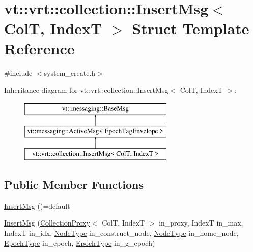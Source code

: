 \hypertarget{structvt_1_1vrt_1_1collection_1_1_insert_msg}{}\section{vt\+:\+:vrt\+:\+:collection\+:\+:Insert\+Msg$<$ ColT, IndexT $>$ Struct Template Reference}
\label{structvt_1_1vrt_1_1collection_1_1_insert_msg}


{\ttfamily \#include $<$system\+\_\+create.\+h$>$}

Inheritance diagram for vt\+:\+:vrt\+:\+:collection\+:\+:Insert\+Msg$<$ ColT, IndexT $>$\+:\begin{figure}[H]
\begin{center}
\leavevmode
\includegraphics[height=3.000000cm]{structvt_1_1vrt_1_1collection_1_1_insert_msg}
\end{center}
\end{figure}
\subsection*{Public Member Functions}
\begin{DoxyCompactItemize}
\item 
\hyperlink{structvt_1_1vrt_1_1collection_1_1_insert_msg_a44aed2e193e9972e28eb9c757cfe4e0b}{Insert\+Msg} ()=default
\item 
\hyperlink{structvt_1_1vrt_1_1collection_1_1_insert_msg_a56b81ce822e935c00a7419734844d288}{Insert\+Msg} (\hyperlink{structvt_1_1vrt_1_1collection_1_1_collection_proxy}{Collection\+Proxy}$<$ ColT, IndexT $>$ in\+\_\+proxy, IndexT in\+\_\+max, IndexT in\+\_\+idx, \hyperlink{namespacevt_a866da9d0efc19c0a1ce79e9e492f47e2}{Node\+Type} in\+\_\+construct\+\_\+node, \hyperlink{namespacevt_a866da9d0efc19c0a1ce79e9e492f47e2}{Node\+Type} in\+\_\+home\+\_\+node, \hyperlink{namespacevt_a985a5adf291c34a3ca263b3378388236}{Epoch\+Type} in\+\_\+epoch, \hyperlink{namespacevt_a985a5adf291c34a3ca263b3378388236}{Epoch\+Type} in\+\_\+g\+\_\+epoch)
\end{DoxyCompactItemize}
